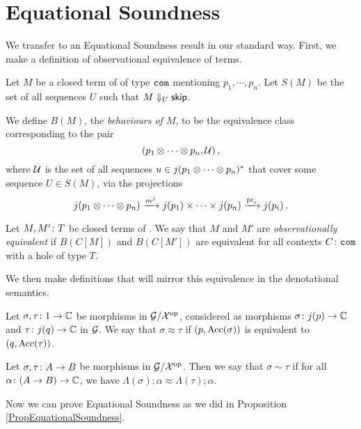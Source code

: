 \section{Equational Soundness}

We transfer to an Equational Soundness result in our standard way.
First, we make a definition of observational equivalence of \IAXX terms.

\begin{definition}
  Let $M$ be a closed term of \IAXX of type ${\mathtt{com}}$ mentioning $p_1,\cdots,p_n$.
  Let $S(M)$ be the set of all sequences $U$ such that $M\Downarrow_U{\mathsf{skip}}$.

  We define $B(M)$, the \emph{behaviours of $M$}, to be the equivalence class corresponding to the pair
  \[
    (p_1\otimes \cdots \otimes p_n, \mathcal U)\,,
    \]
  where $\mathcal U$ is the set of all sequences $u\in j(p_1\otimes \cdots \otimes p_n)^*$ that cover some sequence $U\in S(M)$, via the projections
  \[
    j(p_1\otimes \cdots \otimes p_n) \xrightarrow{m^j} j(p_1) \times \cdots \times j(p_n) \xrightarrow{\operatorname{pr}_i} j(p_i)\,.
    \]
\end{definition}

\begin{definition}
  Let $M,M'\colon T$ be closed terms of \IAXX.  
  We say that $M$ and $M'$ are \emph{observationally equivalent} if $B(C[M])$ and $B(C[M'])$ are equivalent for all contexts $C\colon {\mathtt{com}}$ with a hole of type $T$.
\end{definition}

We then make definitions that will mirror this equivalence in the denotational semantics.

\begin{definition}
  Let $\sigma,\tau\colon 1 \to \mathbb{C}$ be morphisms in $\mathcal G/\mathcal X^{\mathrm{op}}$, considered as morphisms $\sigma\colon j(p) \to \mathbb{C}$ and $\tau \colon j(q) \to \mathbb{C}$ in $\mathcal G$.  
  We say that $\sigma\approx\tau$ if $(p,\operatorname{Acc}(\sigma))$ is equivalent to $(q,\operatorname{Acc}(\tau))$.
\end{definition}

\begin{definition}
  Let $\sigma,\tau\colon A \to B$ be morphisms in $\mathcal G/\mathcal X^{\mathrm{op}}$.  
  Then we say that $\sigma\sim\tau$ if for all $\alpha\colon (A\to B) \to \mathbb{C}$, we have $\Lambda(\sigma);\alpha \approx \Lambda(\tau);\alpha$.
\end{definition}

Now we can prove Equational Soundness as we did in Proposition \ref{PropEquationalSoundness}.

